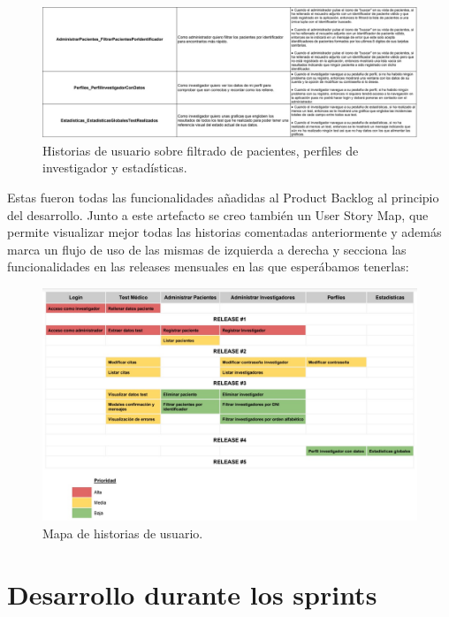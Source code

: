  \begin{figure}[h]
    \centering
     \includegraphics[width=1\textwidth]{images/historiasUsuario-5.jpg}
    \caption{Historias de usuario sobre filtrado de pacientes, perfiles de investigador y estadísticas.}
\end{figure}

Estas fueron todas las funcionalidades añadidas al Product Backlog al principio del desarrollo. Junto a este artefacto se creo también un User Story Map, que permite visualizar mejor todas las historias comentadas anteriormente y además marca un flujo de uso de las mismas de izquierda a derecha y secciona las funcionalidades en las releases mensuales en las que esperábamos tenerlas:
\newline

 \begin{figure}[h]
    \centering
     \includegraphics[width=1\textwidth]{images/userStoryMap.jpg}
    \caption{Mapa de historias de usuario.}
\end{figure}
\newpage

\section{Desarrollo durante los sprints}

